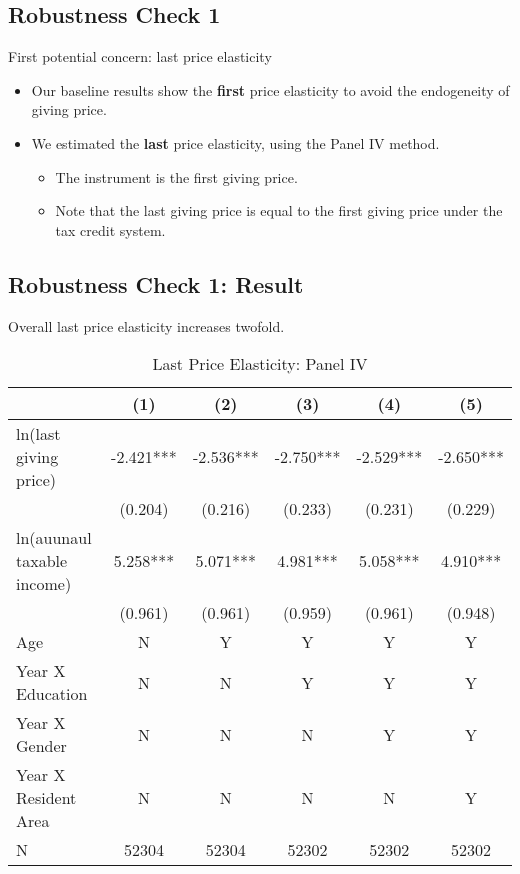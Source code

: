 \documentclass[ review  , 3p ]{elsarticle}
\providecommand{\tightlist}{%
  \setlength{\itemsep}{0pt}\setlength{\parskip}{0pt}}
\begin{document}
  \hypertarget{robustness-check-1}{%
  \subsection{Robustness Check 1}\label{robustness-check-1}}
  
  First potential concern: last price elasticity
  
  \begin{itemize}
  \tightlist
  \item
    Our baseline results show the \textbf{first} price elasticity to avoid the endogeneity of giving price.
  \item
    We estimated the \textbf{last} price elasticity, using the Panel IV method.
  
    \begin{itemize}
    \tightlist
    \item
      The instrument is the first giving price.
    \item
      Note that the last giving price is equal to the first giving price under the tax credit system.
    \end{itemize}
  \end{itemize}
  
  \hypertarget{robustness-check-1-result}{%
  \subsection{Robustness Check 1: Result}\label{robustness-check-1-result}}
  
  Overall last price elasticity increases twofold.
  
  \begin{table}
  
  \caption{\label{tab:kableLastElasticity1}Last Price Elasticity: Panel IV}
  \centering
  \fontsize{7}{9}\selectfont
  \begin{tabular}[t]{lccccc}
  \toprule
   & (1) & (2) & (3) & (4) & (5)\\
  \midrule
  ln(last giving price) & -2.421*** & -2.536*** & -2.750*** & -2.529*** & -2.650***\\
   & (0.204) & (0.216) & (0.233) & (0.231) & (0.229)\\
  ln(auunaul taxable income) & 5.258*** & 5.071*** & 4.981*** & 5.058*** & 4.910***\\
   & (0.961) & (0.961) & (0.959) & (0.961) & (0.948)\\
  Age & N & Y & Y & Y & Y\\
  Year X Education & N & N & Y & Y & Y\\
  Year X Gender & N & N & N & Y & Y\\
  Year X Resident Area & N & N & N & N & Y\\
  N & 52304 & 52304 & 52302 & 52302 & 52302\\
  \bottomrule
  \end{tabular}
  \end{table}
  
\end{document}
